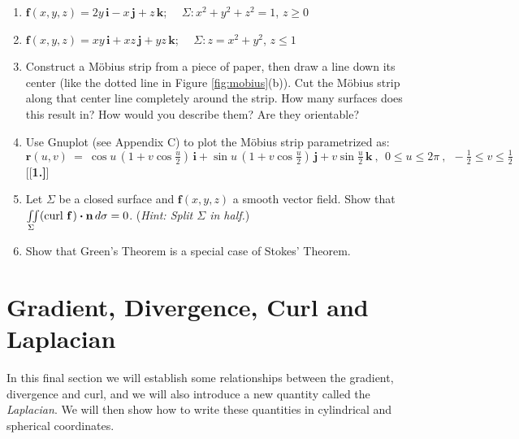 \begin{enumerate}[\bfseries 1.]
\par\noindent For Exercises 14-15, verify Stokes' Theorem for the given vector field $\textbf{f}(x,y,z)$ and
surface $\Sigma$.
[{[\bfseries 1.]}]
 \item $\textbf{f}(x,y,z) = 2y\,\textbf{i} - x\,\textbf{j} + z\,\textbf{k}$; $\quad \Sigma: x^2 + y^2 + z^2 = 1$,
  $z \ge 0$
 \item $\textbf{f}(x,y,z) = xy\,\textbf{i} + xz\,\textbf{j} + yz\,\textbf{k}$; $\quad \Sigma: z=x^2 + y^2$, $z \le 1$
 \item Construct a M\"{o}bius strip from a piece of paper, then draw a line down its center (like the dotted line in
 Figure \ref{fig:mobius}(b)). Cut the M\"{o}bius strip along that center line completely around the strip. How many
 surfaces does this result in? How would you describe them? Are they orientable?
 \item Use Gnuplot (see Appendix C) to plot the M\"{o}bius strip parametrized as:
  \begin{displaymath}
   \textbf{r}(u,v) ~=~ \cos u \,(1+v\cos \tfrac{u}{2})\,\textbf{i} + \sin u \,(1+v\cos \tfrac{u}{2})\,\textbf{j} +
    v\sin \tfrac{u}{2}\,\textbf{k} ~,~~ 0 \le u \le 2\pi ~,~~ -\tfrac{1}{2} \le v \le \tfrac{1}{2}
  \end{displaymath}
[{[\bfseries 1.]}]
 \item Let $\Sigma$ be a closed surface and $\textbf{f}(x,y,z)$ a smooth vector field. Show that\\
  $\iint\limits_{\Sigma} (\text{curl}~{\textbf{f}}\,) \bm{\cdot} \textbf{n}\,d\sigma = 0$. (\emph{Hint: Split $\Sigma$
  in half.})
 \item Show that Green's Theorem is a special case of Stokes' Theorem.
\end{enumerate}
\newpage
\section{Gradient, Divergence, Curl and Laplacian}
In this final section we will establish some relationships between the gradient, divergence and curl, and we will
also introduce a new quantity called the \emph{Laplacian}. We will then show how to write these quantities in
cylindrical and spherical coordinates.

